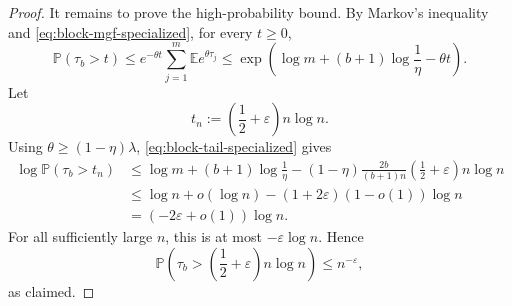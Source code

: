 \documentclass[10pt,a4paper]{amsart}
\newcommand{\E}{\mathbb{E}}
\newcommand{\eps}{\varepsilon}
\renewcommand{\P}{\mathbb{P}}
\begin{document}
\begin{proof}
It remains to prove the high-probability bound. By Markov's inequality and \eqref{eq:block-mgf-specialized}, for every \(t\ge0\),
\begin{equation}\label{eq:block-tail-specialized}
\P(\tau_b>t)
\le
e^{-\theta t}\sum_{j=1}^m \E e^{\theta\tau_j}
\le
\exp\left(
\log m+(b+1)\log\frac1\eta-\theta t
\right).
\end{equation}
Let
\[
t_n:=\left(\frac12+\eps\right)n\log n.
\]
Using \(\theta\ge (1-\eta)\lambda\), \eqref{eq:block-tail-specialized} gives
\begin{align*}
\log \P(\tau_b>t_n)
&\le
\log m+(b+1)\log\frac1\eta
-
(1-\eta)\frac{2b}{(b+1)n}
\left(\frac12+\eps\right)n\log n  \\
&\le
\log n+o(\log n)
-
(1+2\eps)(1-o(1))\log n  \\
&=
(-2\eps+o(1))\log n.
\end{align*}
For all sufficiently large \(n\), this is at most \(-\eps\log n\). Hence
\[
\P\left(\tau_b>\left(\frac12+\eps\right)n\log n\right)\le n^{-\eps},
\]
as claimed.
\end{proof}
\end{document}
